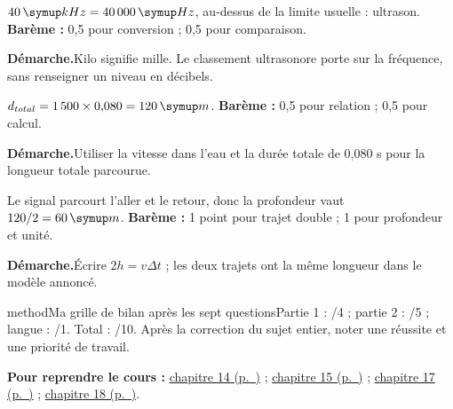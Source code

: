 \label{cor-bb-6}
\par\noindent\begin{minipage}{\linewidth}
$40\unite{kHz}=40\,000\unite{Hz}$, au-dessus de la limite usuelle : ultrason. \textbf{Barème :} 0,5 pour conversion ; 0,5 pour comparaison.\par
\smallskip\noindent\textbf{Démarche.}\enspace Kilo signifie mille. Le classement ultrasonore porte sur la fréquence, sans renseigner un niveau en décibels.\par
\end{minipage}\par
\par\noindent\begin{minipage}{\linewidth}
$d_{total}=1\,500\times0{,}080=120\unite m$. \textbf{Barème :} 0,5 pour relation ; 0,5 pour calcul.\par
\smallskip\noindent\textbf{Démarche.}\enspace Utiliser la vitesse dans l’eau et la durée totale de 0,080 s pour la longueur totale parcourue.\par
\end{minipage}\par
\par\noindent\begin{minipage}{\linewidth}
Le signal parcourt l’aller et le retour, donc la profondeur vaut $120/2=60\unite m$. \textbf{Barème :} 1 point pour trajet double ; 1 pour profondeur et unité.\par
\smallskip\noindent\textbf{Démarche.}\enspace Écrire $2h=v\Delta t$ ; les deux trajets ont la même longueur dans le modèle annoncé.\par
{}
\end{minipage}\par
\par\noindent\begin{minipage}{\linewidth}
\begin{pcEncadre}{method}{Ma grille de bilan après les sept questions}Partie 1 : /4 ; partie 2 : /5 ; langue : /1. Total : /10. Après la correction du sujet entier, noter une réussite et une priorité de travail.\end{pcEncadre}
{\small\textbf{Pour reprendre le cours : }\hyperref[chap-14]{chapitre 14 (p.~\pageref*{chap-14})} ; \hyperref[chap-15]{chapitre 15 (p.~\pageref*{chap-15})} ; \hyperref[chap-17]{chapitre 17 (p.~\pageref*{chap-17})} ; \hyperref[chap-18]{chapitre 18 (p.~\pageref*{chap-18})}.\par}\end{minipage}\par
